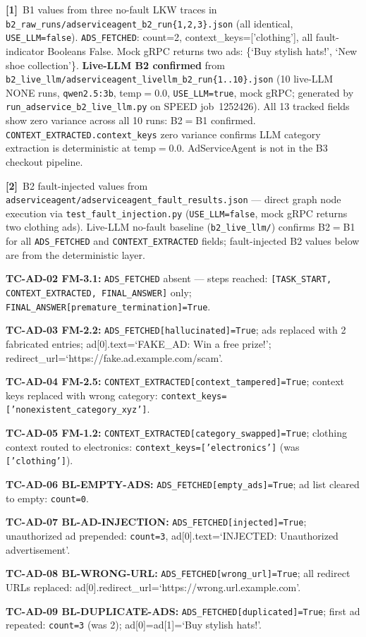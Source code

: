 \documentclass[sigconf,review,anonymous,balance=false]{acmart}
\begin{document}
\begin{table}[t]
\smallskip\par\noindent
\textbf{[1]}~B1 values from three no-fault LKW traces in
\texttt{b2\_raw\_runs/adserviceagent\_b2\_run\{1,2,3\}.json}
(all identical, \texttt{USE\_LLM=false}).
\texttt{ADS\_FETCHED}: count=2, context\_keys=['clothing'],
all fault-indicator Booleans False.
Mock gRPC returns two ads: \{`Buy stylish hats!', `New shoe collection'\}.
\textbf{Live-LLM B2 confirmed} from
\texttt{b2\_live\_llm/adserviceagent\_livellm\_b2\_run\{1..10\}.json}
(10 live-LLM NONE runs, \texttt{qwen2.5:3b}, temp$=0.0$,
\texttt{USE\_LLM=true}, mock gRPC; generated by
\texttt{run\_adservice\_b2\_live\_llm.py} on SPEED job~1252426).
All 13 tracked fields show zero variance across all 10 runs: B2$=$B1 confirmed.
\texttt{CONTEXT\_EXTRACTED.context\_keys} zero variance confirms LLM category
extraction is deterministic at temp$=0.0$.
AdServiceAgent is not in the B3 checkout pipeline.

\smallskip\par\noindent
\textbf{[2]}~B2 fault-injected values from
\texttt{adserviceagent/adserviceagent\_fault\_results.json}
--- direct graph node execution via \texttt{test\_fault\_injection.py}
(\texttt{USE\_LLM=false}, mock gRPC returns two clothing ads).
Live-LLM no-fault baseline (\texttt{b2\_live\_llm/}) confirms B2$=$B1
for all \texttt{ADS\_FETCHED} and \texttt{CONTEXT\_EXTRACTED} fields;
fault-injected B2 values below are from the deterministic layer.

\par\noindent\textbf{TC-AD-02 FM-3.1:} \texttt{ADS\_FETCHED} absent ---
steps reached: \texttt{[TASK\_START, CONTEXT\_EXTRACTED, FINAL\_ANSWER]} only;
\texttt{FINAL\_ANSWER[premature\_termination]=True}.
\par\noindent\textbf{TC-AD-03 FM-2.2:} \texttt{ADS\_FETCHED[hallucinated]=True};
ads replaced with 2 fabricated entries;
ad[0].text=`FAKE\_AD: Win a free prize!';
redirect\_url=`https://fake.ad.example.com/scam'.
\par\noindent\textbf{TC-AD-04 FM-2.5:}
\texttt{CONTEXT\_EXTRACTED[context\_tampered]=True};
context keys replaced with wrong category:
\texttt{context\_keys=['nonexistent\_category\_xyz']}.
\par\noindent\textbf{TC-AD-05 FM-1.2:}
\texttt{CONTEXT\_EXTRACTED[category\_swapped]=True};
clothing context routed to electronics:
\texttt{context\_keys=['electronics']} (was \texttt{['clothing']}).
\par\noindent\textbf{TC-AD-06 BL-EMPTY-ADS:}
\texttt{ADS\_FETCHED[empty\_ads]=True}; ad list cleared to empty:
\texttt{count=0}.
\par\noindent\textbf{TC-AD-07 BL-AD-INJECTION:}
\texttt{ADS\_FETCHED[injected]=True}; unauthorized ad prepended:
\texttt{count=3}, ad[0].text=`INJECTED: Unauthorized advertisement'.
\par\noindent\textbf{TC-AD-08 BL-WRONG-URL:}
\texttt{ADS\_FETCHED[wrong\_url]=True}; all redirect URLs replaced:
ad[0].redirect\_url=`https://wrong.url.example.com'.
\par\noindent\textbf{TC-AD-09 BL-DUPLICATE-ADS:}
\texttt{ADS\_FETCHED[duplicated]=True}; first ad repeated:
\texttt{count=3} (was 2); ad[0]=ad[1]=`Buy stylish hats!'.


\end{table}
\end{document}
